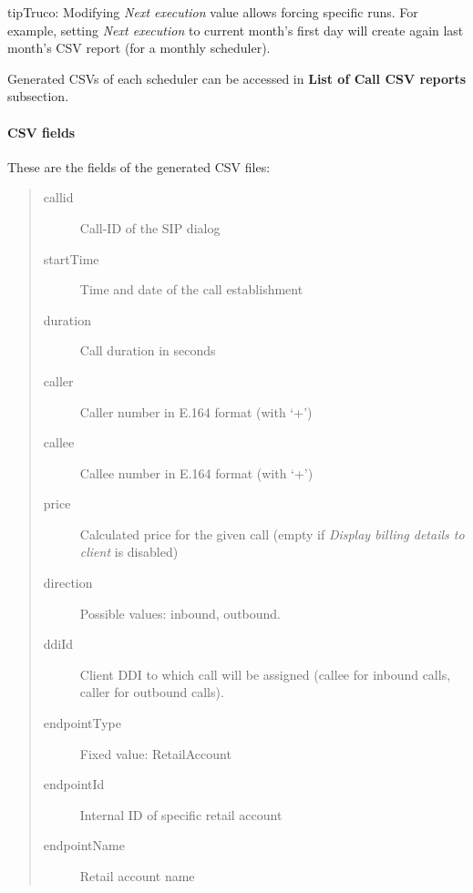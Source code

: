 \documentclass[letterpaper,10pt,spanish]{sphinxmanual}
\begin{document}
\begin{notice}{tip}{Truco:}
Modifying \emph{Next execution} value allows forcing specific runs. For example, setting \emph{Next execution} to
current month's first day will create again last month's CSV report (for a monthly scheduler).
\end{notice}

Generated CSVs of each scheduler can be accessed in \textbf{List of Call CSV reports} subsection.


\paragraph{CSV fields}
\label{administration_portal/client/retail/calls/call_csv_schedulers:csv-fields}
These are the fields of the generated CSV files:
\begin{quote}
\begin{description}
\item[{callid}] \leavevmode
Call-ID of the SIP dialog

\item[{startTime}] \leavevmode
Time and date of the call establishment

\item[{duration}] \leavevmode
Call duration in seconds

\item[{caller}] \leavevmode
Caller number in E.164 format (with `+')

\item[{callee}] \leavevmode
Callee number in E.164 format (with `+')

\item[{price}] \leavevmode
Calculated price for the given call (empty if \emph{Display billing details to client} is disabled)

\item[{direction}] \leavevmode
Possible values: inbound, outbound.

\item[{ddiId}] \leavevmode
Client DDI to which call will be assigned (callee for inbound calls, caller for outbound calls).

\item[{endpointType}] \leavevmode
Fixed value: RetailAccount

\item[{endpointId}] \leavevmode
Internal ID of specific retail account

\item[{endpointName}] \leavevmode
Retail account name

\end{description}
\end{quote}
\end{document}
